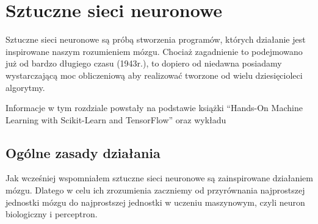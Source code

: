 \documentclass{article}
\begin{document}
\section{Sztuczne sieci neuronowe}
Sztuczne sieci neuronowe są próbą stworzenia programów, których działanie jest inspirowane naszym rozumieniem mózgu.
Chociaż zagadnienie to podejmowano już od bardzo długiego czasu (1943r.), to dopiero od niedawna posiadamy wystarczającą moc obliczeniową aby realizować tworzone od wielu dziesięcioleci algorytmy.

Informacje w tym rozdziale powstały na podstawie książki ``Hands-On Machine Learning with Scikit-Learn and TensorFlow''\cite{handsonmachinelearning} oraz wykładu\cite{wyklad}
\subsection{Ogólne zasady działania}
Jak wcześniej wspomniałem sztuczne sieci neuronowe są zainspirowane działaniem mózgu. Dlatego w celu ich zrozumienia zaczniemy od przyrównania najprostszej jednostki mózgu do najprostszej jednostki w uczeniu maszynowym, czyli neuron biologiczny i perceptron.
\end{document}
